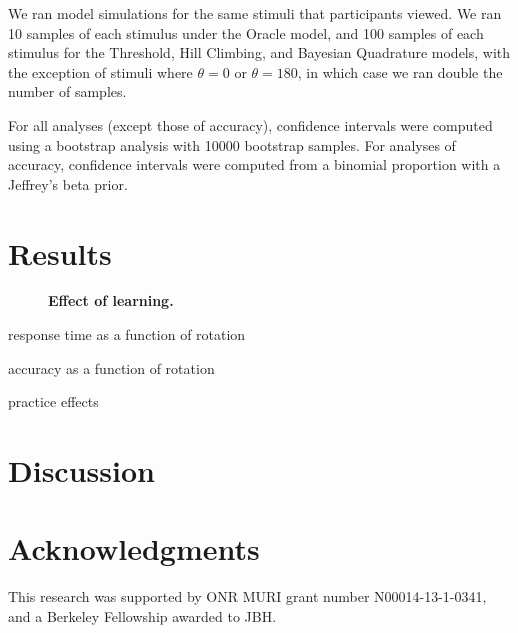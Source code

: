 \documentclass[10pt,letterpaper]{article}
\begin{document}
We ran model simulations for the same stimuli that participants
viewed. We ran 10 samples of each stimulus under the Oracle model, and
100 samples of each stimulus for the Threshold, Hill Climbing, and
Bayesian Quadrature models, with the exception of stimuli where
$\theta=0$ or $\theta=180$, in which case we ran double the number of
samples.

For all analyses (except those of accuracy), confidence intervals were
computed using a bootstrap analysis with 10000 bootstrap samples. For
analyses of accuracy, confidence intervals were computed from a
binomial proportion with a Jeffrey's beta prior.

\section{Results}

\begin{figure}[t]
  \centering
  \caption{\textbf{Effect of learning.}}
  \label{fig:learning}
\end{figure}

response time as a function of rotation

accuracy as a function of rotation

practice effects

\section{Discussion}


\section{Acknowledgments}

This research was supported by ONR MURI grant number N00014-13-1-0341,
and a Berkeley Fellowship awarded to JBH.



\setlength{\bibleftmargin}{.125in}
\setlength{\bibindent}{-\bibleftmargin}


\end{document}
